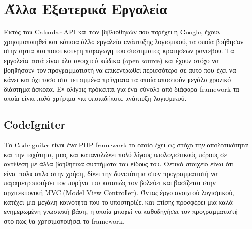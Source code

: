 
\chapter{Άλλα Εξωτερικά Εργαλεία}
Εκτός του Calendar API και των βιβλιοθηκών που παρέχει η Google, έχουν χρησιμοποιηθεί και κάποια άλλα εργαλεία ανάπτυξης λογισμικού, τα οποία βοήθησαν στην άρτια και ποιοτικότερη παραγωγή του συστήματος κρατήσεων ραντεβού. Τα εργαλεία αυτά είναι όλα ανοιχτού κώδικα (open source) και έχουν στόχο να βοηθήσουν τον προγραμματιστή να επικεντρωθεί περισσότερο σε αυτό που έχει να κάνει και όχι τόσο στα τετριμμένα πράγματα τα οποία αποσπούν μεγάλο χρονικό διάστημα άσκοπα. Εν ολίγοις πρόκειται για ένα σύνολο από διάφορα framework τα οποία είναι πολύ χρήσιμα για οποιαδήποτε ανάπτυξη λογισμικού.

\section{CodeIgniter}
Το CodeIgniter είναι ένα PHP framework το οποίο έχει ως στόχο την αποδοτικότητα και την ταχύτητα, μιας και καταναλώνει πολύ λίγους υπολογιστικούς πόρους σε αντίθεση με άλλα βοηθητικά συστήματα του είδους του. Θετικό στοιχείο είναι ότι είναι πολύ απλό στην χρήση, δίνει την δυνατότητα στον προγραμματιστή να παραμετροποιήσει τον πυρήνα του καταπώς τον βολεύει και βασίζεται στην αρχιτεκτονική MVC (Model View Controller). Όντας έργο ανοιχτού λογισμικού, κατέχει μια μεγάλη κοινότητα που το υποστηρίζει και επίσης προσφέρει μια καλά ενημερωμένη γνωσιακή βάση, η οποία μπορεί να καθοδηγήσει τον προγραμματιστή στο πως θα χρησιμοποιήσει το framework.

